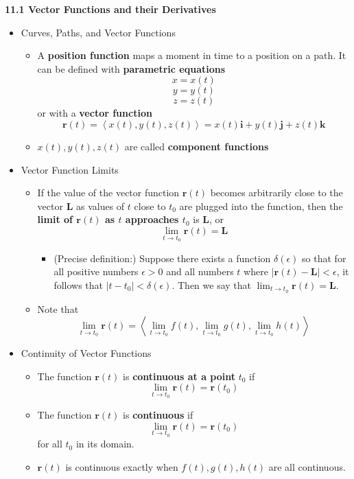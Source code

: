 \documentclass[12pt]{article}
\renewcommand{\vec}[1]{\mathbf{#1}}
\newcommand{\veci}{\mathbf{i}}
\newcommand{\vecj}{\mathbf{j}}
\newcommand{\veck}{\mathbf{k}}
\newcommand{\<}{\left<}
\renewcommand{\>}{\right>}
\begin{document}
\newpage

\centerline{\bf 11.1 Vector Functions and their Derivatives}

\begin{itemize}
  \item Curves, Paths, and Vector Functions
    \begin{itemize}
      \item A \textbf{position function} maps a moment in time to a position on a path. It can be defined with \textbf{parametric equations} \[x=x(t)\] \[y=y(t)\] \[z=z(t)\] or with a \textbf{vector function} \[\vec{r}(t) = \<x(t),y(t),z(t)\> = x(t)\veci + y(t)\vecj + z(t)\veck\]
      \item $x(t),y(t),z(t)$ are called \textbf{component functions}
    \end{itemize}

  \item Vector Function Limits
    \begin{itemize}
    \item If the value of the vector function $\vec{r}(t)$ becomes arbitrarily close to the vector $\vec{L}$ as values of $t$ close to $t_0$ are plugged into the function, then the \textbf{limit of $\vec{r}(t)$ as $t$ approaches $t_0$} is $\vec{L}$, or \[\lim_{t\to t_0} \vec{r}(t) = \vec{L}\]
      \begin{itemize}
      \item (Precise definition:) Suppose there exists a function $\delta(\epsilon)$ so that for all positive numbers $\epsilon>0$ and all numbers $t$ where $|\vec{r}(t)-\vec{L}|<\epsilon$, it follows that $|t-t_0|<\delta(\epsilon)$. Then we say that $\lim_{t\to t_0} \vec{r}(t) = \vec{L}$.
      \end{itemize}
    \item Note that \[\lim_{t\to t_0} \vec{r}(t) = \<\lim_{t\to t_0} f(t), \lim_{t\to t_0} g(t), \lim_{t\to t_0} h(t)\>\]
    \end{itemize}

  \item Continuity of Vector Functions
    \begin{itemize}
      \item The function $\vec{r}(t)$ is \textbf{continuous at a point} $t_0$ if \[\lim_{t\to t_0}\vec{r}(t) = \vec{r}(t_0)\]
      \item
      The function $\vec{r}(t)$ is \textbf{continuous} if \[\lim_{t\to t_0}\vec{r}(t) = \vec{r}(t_0)\] for all $t_0$ in its domain.
      \item $\vec{r}(t)$ is continuous exactly when $f(t),g(t),h(t)$ are all continuous.
    \end{itemize}


\end{itemize}
\end{document}
